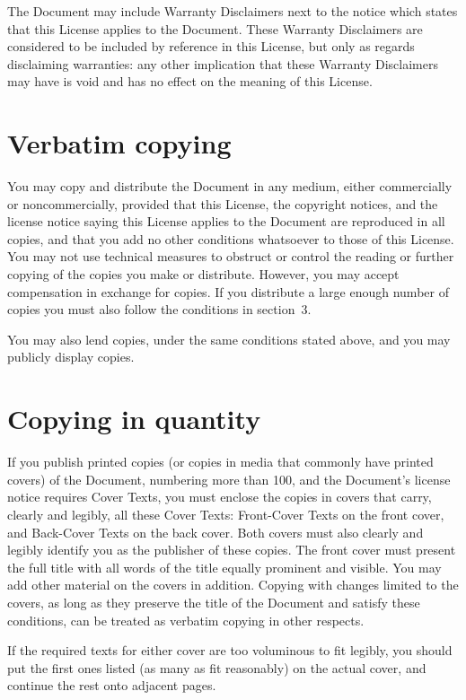 \documentclass[a4paper,spanish,12pt]{book}
\begin{document}
The Document may include Warranty Disclaimers next to the notice which
states that this License applies to the Document.  These Warranty
Disclaimers are considered to be included by reference in this
License, but only as regards disclaiming warranties: any other
implication that these Warranty Disclaimers may have is void and has
no effect on the meaning of this License.

\section{Verbatim copying}

You may copy and distribute the Document in any medium, either
commercially or noncommercially, provided that this License, the
copyright notices, and the license notice saying this License applies
to the Document are reproduced in all copies, and that you add no other
conditions whatsoever to those of this License.  You may not use
technical measures to obstruct or control the reading or further
copying of the copies you make or distribute.  However, you may accept
compensation in exchange for copies.  If you distribute a large enough
number of copies you must also follow the conditions in section~3.

You may also lend copies, under the same conditions stated above, and
you may publicly display copies.

\section{Copying in quantity}

If you publish printed copies (or copies in media that commonly have
printed covers) of the Document, numbering more than 100, and the
Document's license notice requires Cover Texts, you must enclose the
copies in covers that carry, clearly and legibly, all these Cover
Texts: Front-Cover Texts on the front cover, and Back-Cover Texts on
the back cover.  Both covers must also clearly and legibly identify
you as the publisher of these copies.  The front cover must present
the full title with all words of the title equally prominent and
visible.  You may add other material on the covers in addition.
Copying with changes limited to the covers, as long as they preserve
the title of the Document and satisfy these conditions, can be treated
as verbatim copying in other respects.

If the required texts for either cover are too voluminous to fit
legibly, you should put the first ones listed (as many as fit
reasonably) on the actual cover, and continue the rest onto adjacent
pages.
\end{document}
